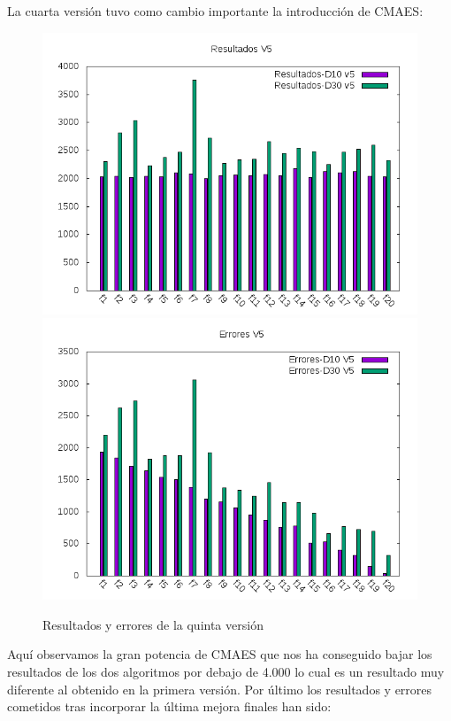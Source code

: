 \documentclass[12pt,a4paper]{article}
\begin{document}
	La cuarta versión tuvo como cambio importante la introducción de CMAES:
	
	\begin{figure}[!h]
		\includegraphics[scale=0.5]{../Algoritmo/resultados/Imagenes/Resultados/resultados_v5.png}
		\includegraphics[scale=0.5]{../Algoritmo/resultados/Imagenes/Errores/errores_v5.png}
		\caption{Resultados y errores de la quinta versión}
	\end{figure}

	Aquí observamos la gran potencia de CMAES que nos ha conseguido bajar los resultados de los dos algoritmos por debajo de 4.000 lo cual es un resultado muy diferente al obtenido en la primera versión. Por último los resultados y errores cometidos tras incorporar la última mejora finales han sido:
	
\end{document}
